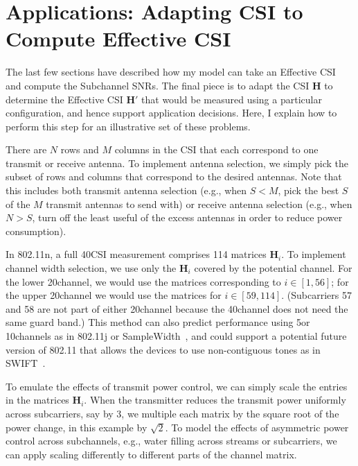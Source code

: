 \section{Applications: Adapting CSI to Compute Effective CSI}
\label{sec:model_applications}
The last few sections have described how my model can take an Effective CSI and compute the Subchannel SNRs. The final piece is to adapt the CSI $\mathbf{H}$ to determine the Effective CSI $\mathbf{H}'$ that would be measured using a particular configuration, and hence support application decisions. Here, I explain how to perform this step for an illustrative set of these problems.

 There are $N$ rows and $M$ columns in the CSI that each correspond to one transmit or receive antenna. To implement antenna selection, we simply pick the subset of rows and columns that correspond to the desired antennas. Note that this includes both transmit antenna selection (e.g., when $S<M$, pick the best $S$ of the $M$ transmit antennas to send with) or receive antenna selection (e.g., when $N>S$, turn off the least useful of the excess antennas in order to reduce power consumption).

 In 802.11n, a full 40\MHz CSI measurement comprises 114 matrices $\mathbf{H}_i$. To implement channel width selection, we use only the $\mathbf{H}_i$ covered by the potential channel. For the lower 20\MHz channel, we would use the matrices corresponding to $i \in [1,56]$; for the upper 20\MHz channel we would use the matrices for $i \in [59,114]$. (Subcarriers 57 and 58 are not part of either 20\MHz channel because the 40\MHz channel does not need the same guard band.) This method can also predict performance using 5\MHz or 10\MHz channels as in 802.11j or SampleWidth~\cite{Chandra_SampleWidth}, and could support a potential future version of 802.11 that allows the devices to use non-contiguous tones as in SWIFT~\cite{Rahul_SWIFT}.

 To emulate the effects of transmit power control, we can simply scale the entries in the matrices $\mathbf{H}_i$. When the transmitter reduces the transmit power uniformly across subcarriers, say by 3\dB, we multiple each matrix by the square root of the power change, in this example by $\sqrt{2}$. To model the effects of asymmetric power control across subchannels, e.g., water filling across streams or subcarriers, we can apply scaling differently to different parts of the channel matrix.

